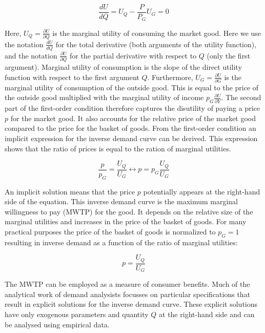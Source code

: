 \documentclass[
]{book}
\begin{document}
\begin{equation}
\frac{dU}{dQ} = U_Q - \frac{P}{P_G}U_G = 0
\end{equation}

Here, \(U_Q=\frac{\partial U}{\partial Q}\) is the marginal utility of consuming the market good. Here we use the notation \(\frac{dU}{dQ}\) for the total derivative (both arguments of the utility function), and the notation \(\frac{\partial U}{\partial Q}\) for the partial derivative with respect to \(Q\) (only the first argument). Marginal utility of consumption is the slope of the direct utility function with respect to the first argument \(Q\). Furthermore, \(U_G=\frac{\partial U}{\partial G}\) is the marginal utility of consumption of the outside good. This is equal to the price of the outside good multiplied with the marginal utility of income \(p_G \frac{\partial U}{\partial Y}\). The second part of the first-order condition therefore captures the disutility of paying a price \(p\) for the market good. It also accounts for the relative price of the market good compared to the price for the basket of goods. From the first-order condition an implicit expression for the inverse demand curve can be derived. This expression shows that the ratio of prices is equal to the ration of marginal utilities.

\begin{equation}
\frac{p}{p_G} = \frac{U_Q}{U_G} \longleftrightarrow p = p_G\frac{U_Q}{U_G}
\end{equation}

An implicit solution means that the price \(p\) potentially appears at the right-hand side of the equation. This inverse demand curve is the maximum marginal willingness to pay (MWTP) for the good. It depends on the relative size of the marginal utilities and increases in the price of the basket of goods. For many practical purposes the price of the basket of goods is normalized to \(p_G=1\) resulting in inverse demand as a function of the ratio of marginal utilities:

\begin{equation} 
p = \frac{U_Q}{U_G}
\end{equation}

The MWTP can be employed as a measure of consumer benefits. Much of the analytical work of demand analysists focusses on particular specifications that result in explicit solutions for the inverse demand curve. These explicit solutions have only exogenous parameters and quantity \(Q\) at the right-hand side and can be analysed using empirical data.
\end{document}
